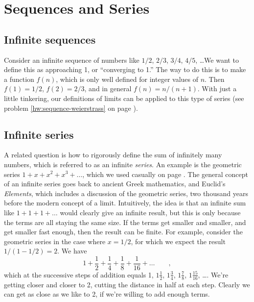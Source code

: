 \chapter{Sequences and Series}

\section{Infinite sequences}

Consider an infinite sequence of numbers like $1/2$, $2/3$, $3/4$, $4/5$, \ldots We want to define
this as approaching 1, or ``converging to 1.'' The way to do this is to make a function $f(n)$, which is only
well defined for integer values of $n$. Then $f(1)=1/2$, $f(2)=2/3$, and in general
$f(n)=n/(n+1)$. With just a little tinkering, our definitions of limits can be
applied to this type of series (see problem \ref{hw:sequence-weierstrass} on page \pageref{hw:sequence-weierstrass}).

\section{Infinite series}
A related question is how to rigorously define the sum of infinitely many numbers, which is referred to
as an infinite \emph{series}. An example is the geometric series
$1+x+x^2+x^3+\ldots$,
which we used casually on page \pageref{geometric-series}.
The general concept of an infinite series goes back
to ancient Greek mathematics, and Euclid's \emph{Elements}, which includes a discussion of the geometric series,
two thousand years before the modern concept of a limit. Intuitively, the idea is that an infinite sum like $1+1+1+\ldots$ would
clearly give an infinite result, but this is only because the terms are all staying the same size. If the terms get
smaller and smaller, and get smaller fast enough, then the result can be finite. For example, consider the geometric
series in the case where $x=1/2$, for which we expect the result $1/(1-1/2)=2$. We have
\begin{equation*}
  1 + \frac{1}{2} + \frac{1}{4} + \frac{1}{8} + \frac{1}{16} + \ldots \qquad ,
\end{equation*}
which at the successive steps of addition equals 1, $1\frac{1}{2}$, $1\frac{3}{4}$, $1\frac{7}{8}$,  $1\frac{15}{16}$, \ldots.
We're getting closer and closer to 2, cutting the distance in half at each step. Clearly we can get as close as we like to 2,
if we're willing to add enough terms.

